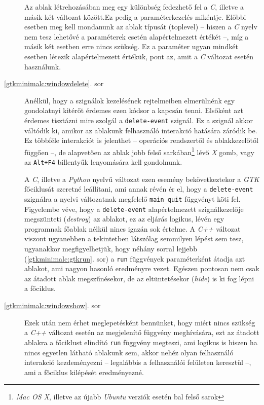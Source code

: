 \begin{description}
 Az ablak létrehozásában meg egy különbség fedezhető fel a \textit{C}, illetve a másik két változat között.Ez pedig a paraméterkezelés mikéntje. Előbbi esetben meg kell mondanunk az ablak típusát (toplevel) -- hiszen a \textit{C} nyelv nem tesz lehetővé a paraméterek esetén alapértelmezett értékét --, míg a másik két esetben erre nincs szükség. Ez a paraméter ugyan mindkét esetben létezik alapértelmezett értékük, pont az, amit a \textit{C} változat esetén használunk.

 \item[\ref{gtkminimalc:windowdelete}. sor] Anélkül, hogy a szignálok kezelésének rejtelmeiben elmerülnénk egy gondolatnyi kitérőt érdemes ezen kódsor a kapcsán tenni. Elsőként azt érdemes tisztázni mire szolgál a \texttt{delete-event} szignál. Ez a szignál akkor váltódik ki, amikor az ablakunk felhasználó interakció hatására záródik be. Ez többféle interakciót is jelenthet -- operációs rendszertől és ablakkezelőtől függően --, de alapvetően az ablak jobb felső sarkában\footnote{\textit{Mac OS X}, illetve az újabb \textit{Ubuntu} verziók esetén bal felső sarok} lévő \textit{X} gomb, vagy az \texttt{Alt+F4} billentyűk lenyomására kell gondolnunk.

  A \textit{C}, illetve a \textit{Python} nyelvű változat ezen esemény bekövetkeztekor a \textit{GTK} főciklusát szeretné leállítani, ami annak révén ér el, hogy a \texttt{delete-event} szignálra a nyelvi változatnak megfelelő \texttt{main\_quit} függvényt köti fel. Figyelembe véve, hogy a \texttt{delete-event} alapértelmezett szignálkezelője megszünteti (\textit{destroy}) az ablakot, ez az eljárás logikus, lévén egy programnak főablak nélkül nincs igazán sok értelme. A \textit{C++} változat viszont ugyanebben a tekintetben látszólag semmilyen lépést sem tesz, ugyanakkor megfigyelhetjük, hogy néhány sorral lejjebb (\ref{gtkminimalc:gtkrun}. sor) a \texttt{run} függvények paraméterként átadja azt ablakot, ami nagyon hasonló eredményre vezet. Egészen pontosan nem csak az átadott ablak megszűnésekor, de az eltüntetésekor (\textit{hide}) is ki fog lépni a főciklus.

  \item[\ref{gtkminimalc:windowshow}. sor] Ezek után nem érhet meglepetésként bennünket, hogy miért nincs szükség a \textit{C++} változat esetén az megjelenítő függvény meghívására, ezt az átadott ablakra a főciklust elindító \texttt{run} függvény megteszi, ami logikus is hiszen ha nincs egyetlen látható ablakunk sem, akkor nehéz olyan felhasználó interakció kezdeményezni -- legalábbis a felhasználói felületen keresztül --, ami a főciklus kilépését eredményezné.


\end{description}
